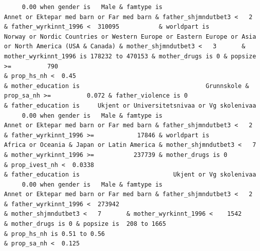 \documentclass[
  letterpaper,
  DIV=11,
  numbers=noendperiod]{scrreprt}
\begin{document}
\begin{verbatim}
     0.00 when gender is   Male & famtype is                        Annet or Ektepar med barn or Far med barn & father_shjmndutbet3 <   2       & father_wyrkinnt_1996 <  310095           & worldpart is                              Norway or Nordic Countries or Western Europe or Eastern Europe or Asia or North America (USA & Canada) & mother_shjmndutbet3 <   3       & mother_wyrkinnt_1996 is 178232 to 470153 & mother_drugs is 0 & popsize >=          790                                                                    & prop_hs_nh <  0.45                                                                                & mother_education is                                   Grunnskole & prop_sa_nh >=          0.072 & father_violence is 0                     & father_education is     Ukjent or Universitetsnivaa or Vg skolenivaa                    
     0.00 when gender is   Male & famtype is                        Annet or Ektepar med barn or Far med barn & father_shjmndutbet3 <   2       & father_wyrkinnt_1996 >=            17846 & worldpart is                                                                                          Africa or Oceania & Japan or Latin America & mother_shjmndutbet3 <   7       & mother_wyrkinnt_1996 >=           237739 & mother_drugs is 0                                                                                                                                                              & prop_ivest_nh <  0.0338                                                                                                                                                        & father_education is                          Ukjent or Vg skolenivaa                    
     0.00 when gender is   Male & famtype is                        Annet or Ektepar med barn or Far med barn & father_shjmndutbet3 <   2       & father_wyrkinnt_1996 <  273942                                                                                                                                                              & mother_shjmndutbet3 <   7       & mother_wyrkinnt_1996 <    1542           & mother_drugs is 0 & popsize is  208 to 1665                                                                    & prop_hs_nh is 0.51 to 0.56                                                                                                                                           & prop_sa_nh <  0.125                                                                                                                                               

\end{verbatim}
\end{document}
